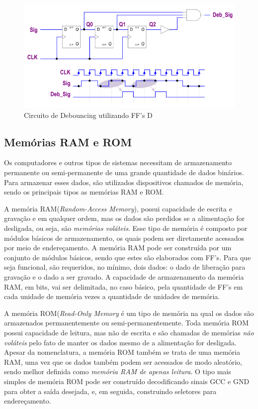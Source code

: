 \documentclass[12pt]{article}
\begin{document}
\begin{figure}[H]
\centering
\includegraphics[width=.7\textwidth]{img/debouncing-ex.png}
\caption{Circuito de Debouncing utilizando FF's D\cite{debouncing-ex}}
\label{fig:debouncing-ex}
\end{figure}

\subsection{Memórias RAM e ROM}

Os computadores e outros tipos de sistemas necessitam de armazenamento permanente ou semi-permanente de uma grande quantidade de dados binários\cite{floyd2011digital}. Para armazenar esses dados, são utilizados dispositivos chamados de memória, sendo os principais tipos as memórias RAM e ROM.

A memória RAM(\textit{Random-Access Memory}), possui capacidade de escrita e gravação e em qualquer ordem, mas os dados são perdidos se a alimentação for desligada, ou seja, são \textit{memórias voláteis}. Esse tipo de memória é composto por módulos básicos de armazenamento, os quais podem ser diretamente acessados por meio de endereçamento\cite{tocci1997digital}. A memória RAM pode ser construída por um conjunto de módulos básicos, sendo que estes são elaborados com FF's. Para que seja funcional, são requeridos, no mínimo, dois dados: o dado de liberação para gravação e o dado a ser gravado. A capacidade de armazenamento da memória RAM, em bits,  vai ser delimitada, no caso básico, pela quantidade de FF's em cada unidade de memória vezes a quantidade de unidades de memória.

A memória ROM(\textit{Read-Only Memory} é um tipo de memória na qual os dados são armazenados permanentemente ou semi-permanentemente. Toda memória ROM possui capacidade de leitura, mas não de escrita e são chamadas de memórias \textit{não voláteis} pelo fato de manter os dados mesmo de a alimentação for desligada. Apesar da nomenclatura, a memória ROM também se trata de uma memória RAM, uma vez que os dados também podem ser acessados de modo aleatório, sendo melhor definida como \textit{memória RAM de apenas leitura}\cite{floyd2011digital}. O tipo mais simples de memória ROM pode ser construído decodificando sinais GCC e GND para obter a saída desejada, e, em seguida, construindo seletores para endereçamento.
\end{document}
